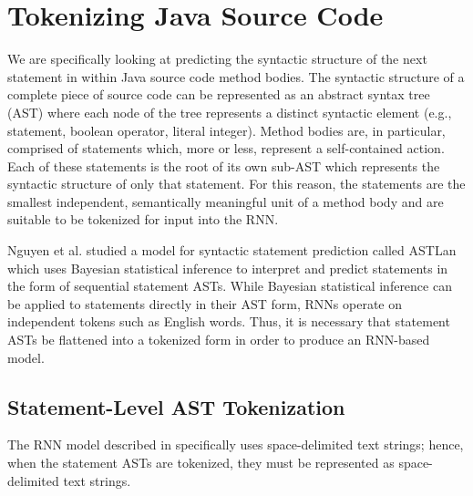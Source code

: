 \documentclass[runningheads,a4paper]{llncs}
\begin{document}


\section{Tokenizing Java Source Code}

We are specifically looking at predicting the syntactic structure  of the next 
statement in within Java source code method bodies. The syntactic structure 
of a complete piece of source code can be represented as an abstract 
syntax tree (AST) where each node of the tree represents a distinct 
syntactic element (e.g., statement, boolean operator, literal integer). 
Method bodies are, in particular, comprised of statements which, more or 
less, represent a self-contained action. Each of these statements is the 
root of its own sub-AST which represents the syntactic structure of only 
that statement. For this reason, the statements are the smallest 
independent, semantically meaningful unit of a method body and are suitable 
to be tokenized for input into the RNN.

Nguyen et al. \cite{Nguyen} studied a model for syntactic statement prediction 
called ASTLan which uses Bayesian statistical inference to interpret and 
predict statements in the form of sequential statement ASTs. While Bayesian 
statistical inference can be applied to statements directly in their AST 
form, RNNs operate on independent tokens such as English words. Thus, it is 
necessary that statement ASTs be flattened into a tokenized form in order to 
produce an RNN-based model.

\subsection{Statement-Level AST Tokenization}

The RNN model described in \citet{LSTMArticle} specifically uses space-delimited 
text strings; hence, when the statement ASTs are tokenized, they 
must be represented as space-delimited text strings.

\end{document}
